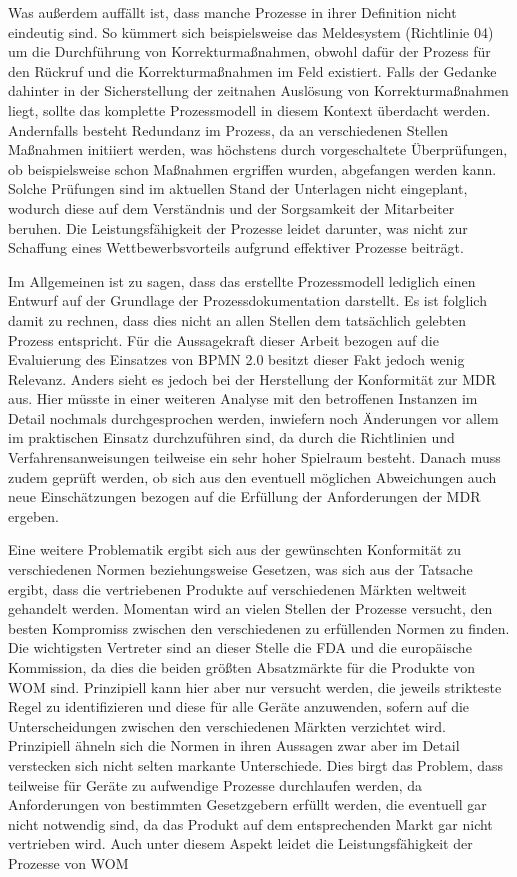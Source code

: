 \documentclass[a4paper,12pt]{report}
\begin{document}
Was außerdem auffällt ist, dass manche Prozesse in ihrer Definition nicht eindeutig sind. So kümmert sich beispielsweise das Meldesystem (Richtlinie 04) um die Durchführung von Korrekturmaßnahmen, obwohl dafür der Prozess für den Rückruf und die Korrekturmaßnahmen im Feld existiert. Falls der Gedanke dahinter in der Sicherstellung der zeitnahen Auslösung von Korrekturmaßnahmen liegt, sollte das komplette Prozessmodell in diesem Kontext überdacht werden. Andernfalls besteht Redundanz im Prozess, da an verschiedenen Stellen Maßnahmen initiiert werden, was höchstens durch vorgeschaltete Überprüfungen, ob beispielsweise schon Maßnahmen ergriffen wurden, abgefangen werden kann. Solche Prüfungen sind im aktuellen Stand der Unterlagen nicht eingeplant, wodurch diese auf dem Verständnis und der Sorgsamkeit der Mitarbeiter beruhen. Die Leistungsfähigkeit der Prozesse leidet darunter, was nicht zur Schaffung eines Wettbewerbsvorteils aufgrund effektiver Prozesse beiträgt.

Im Allgemeinen ist zu sagen, dass das erstellte Prozessmodell lediglich einen Entwurf auf der Grundlage der Prozessdokumentation darstellt. Es ist folglich damit zu rechnen, dass dies nicht an allen Stellen dem tatsächlich gelebten Prozess entspricht. Für die Aussagekraft dieser Arbeit bezogen auf die Evaluierung des Einsatzes von BPMN 2.0 besitzt dieser Fakt jedoch wenig Relevanz. Anders sieht es jedoch bei der Herstellung der Konformität zur MDR aus. Hier müsste in einer weiteren Analyse mit den betroffenen Instanzen im Detail nochmals durchgesprochen werden, inwiefern noch Änderungen vor allem im praktischen Einsatz durchzuführen sind, da durch die Richtlinien und Verfahrensanweisungen teilweise ein sehr hoher Spielraum besteht. Danach muss zudem geprüft werden, ob sich aus den eventuell möglichen Abweichungen auch neue Einschätzungen bezogen auf die Erfüllung der Anforderungen der MDR ergeben.

Eine weitere Problematik ergibt sich aus der gewünschten Konformität zu verschiedenen Normen beziehungsweise Gesetzen, was sich aus der Tatsache ergibt, dass die vertriebenen Produkte auf verschiedenen Märkten weltweit gehandelt werden. Momentan wird an vielen Stellen der Prozesse versucht, den besten Kompromiss zwischen den verschiedenen zu erfüllenden Normen zu finden. Die wichtigsten Vertreter sind an dieser Stelle die FDA und die europäische Kommission, da dies die beiden größten Absatzmärkte für die Produkte von WOM sind. Prinzipiell kann hier aber nur versucht werden, die jeweils strikteste Regel zu identifizieren und diese für alle Geräte anzuwenden, sofern auf die Unterscheidungen zwischen den verschiedenen Märkten verzichtet wird. Prinzipiell ähneln sich die Normen in ihren Aussagen zwar aber im Detail verstecken sich nicht selten markante Unterschiede. Dies birgt das Problem, dass teilweise für Geräte zu aufwendige Prozesse durchlaufen werden, da Anforderungen von bestimmten Gesetzgebern erfüllt werden, die eventuell gar nicht notwendig sind, da das Produkt auf dem entsprechenden Markt gar nicht vertrieben wird. Auch unter diesem Aspekt leidet die Leistungsfähigkeit der Prozesse von WOM
\end{document}
